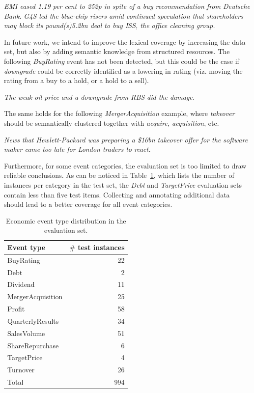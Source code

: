 \documentclass[11pt,a4paper]{article}
\begin{document}
\begin{exe}
    \ex \emph{EMI eased 1.19 per cent to 252p in spite of a buy recommendation from Deutsche Bank.}\label{BR1}
    \ex \emph{G4S led the blue-chip risers amid continued speculation that shareholders may block its pound(s)5.2bn deal to buy ISS, the office cleaning group.}\label{BR2}
\end{exe}

In future work, we intend to improve the lexical coverage by increasing the data set, but also by adding semantic knowledge from structured resources.
The following \emph{BuyRating} event has not been detected, but this could be the case if \emph{downgrade} could be correctly identified as a lowering in rating (viz. moving the rating from a buy to a hold, or a hold to a sell).

\begin{exe}
    \ex \emph{The weak oil price and a downgrade from RBS did the damage.}
\end{exe}

The same holds for the following \emph{MergerAcquisition} example, where \emph{takeover} should be semantically clustered together with \emph{acquire, acquisition}, etc.

\begin{exe}
    \ex \emph{News that Hewlett-Packard was preparing a \$10bn takeover offer for the software maker came too late for London traders to react.}
\end{exe}

Furthermore, for some event categories, the evaluation set is too limited to draw reliable conclusions. As can be noticed in Table~\ref{tab:testInstances}, which lists the number of instances per category in the test set, the \emph{Debt} and \emph{TargetPrice} evaluation sets contain less than five test items. Collecting and annotating additional data should lead to a better coverage for all event categories.

\begin{table}[!htb]
	\centering
	\small{
		\begin{tabular}{lr}
			\textbf{Event type} & \textbf{$\#$  test instances} \\   
			\hline
			BuyRating           & 22    \\
			Debt                &  2    \\
			Dividend            &  11   \\
			MergerAcquisition   &  25   \\
			Profit              &  58   \\
			QuarterlyResults    &  34       \\
			SalesVolume         &  51       \\
			ShareRepurchase     &  6      \\
			TargetPrice         &  4       \\
			Turnover            &  26       \\
			\hdashline
			Total               & 994    \\
		\end{tabular}
		\caption{Economic event type distribution in the evaluation set.}
		\label{tab:testInstances}
	}
\end{table}
\end{document}
